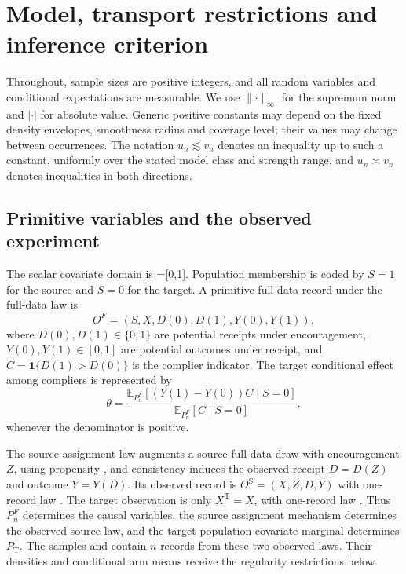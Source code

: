 \documentclass[11pt]{article}
\begin{document}
\section{Model, transport restrictions and inference criterion}
\label{sec:model}

Throughout, sample sizes are positive integers, and all random variables and conditional expectations are measurable. We use \(\lVert\cdot\rVert_\infty\) for the supremum norm and \(|\cdot|\) for absolute value. Generic positive constants may depend on the fixed density envelopes, smoothness radius and coverage level; their values may change between occurrences. The notation \(u_n\lesssim v_n\) denotes an inequality up to such a constant, uniformly over the stated model class and strength range, and \(u_n\asymp v_n\) denotes inequalities in both directions.

\subsection{Primitive variables and the observed experiment}

The scalar covariate domain is =[0,1]. Population membership is coded by \(S=1\) for the source and \(S=0\) for the target. A primitive full-data record under the full-data law  is
\[
O^F=(S,X,D(0),D(1),Y(0),Y(1)),
\]
where \(D(0),D(1)\in\{0,1\}\) are potential receipts under encouragement, \(Y(0),Y(1)\in[0,1]\) are potential outcomes under receipt, and \(C=\mathbf 1\{D(1)>D(0)\}\) is the complier indicator. The target conditional effect among compliers is represented by
\[
\theta=
\frac{\mathbb E_{P_n^F}[(Y(1)-Y(0))C\mid S=0]}
     {\mathbb E_{P_n^F}[C\mid S=0]},
\]
whenever the denominator is positive.

The source assignment law augments a source full-data draw with encouragement \(Z\), using propensity , and consistency induces the observed receipt \(D=D(Z)\) and outcome \(Y=Y(D)\). Its observed record is \(O^{\mathrm S}=(X,Z,D,Y)\) with one-record law . The target observation is only \(X^{\mathrm T}=X\), with one-record law . Thus \(P_n^F\) determines the causal variables, the source assignment mechanism determines the observed source law, and the target-population covariate marginal determines \(P_{\mathrm T}\). The samples  and  contain \(n\) records from these two observed laws. Their densities and conditional arm means receive the regularity restrictions below.
\end{document}
